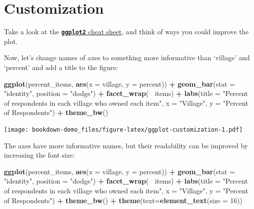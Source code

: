 \documentclass[]{book}
\newenvironment{Shaded}{\begin{snugshade}}{\end{snugshade}}
\newcommand{\KeywordTok}[1]{\textcolor[rgb]{0.13,0.29,0.53}{\textbf{#1}}}
\newcommand{\DataTypeTok}[1]{\textcolor[rgb]{0.13,0.29,0.53}{#1}}
\newcommand{\DecValTok}[1]{\textcolor[rgb]{0.00,0.00,0.81}{#1}}
\newcommand{\StringTok}[1]{\textcolor[rgb]{0.31,0.60,0.02}{#1}}
\newcommand{\OperatorTok}[1]{\textcolor[rgb]{0.81,0.36,0.00}{\textbf{#1}}}
\newcommand{\NormalTok}[1]{#1}
\begin{document}
\section{Customization}\label{customization}

Take a look at the
\href{https://www.rstudio.com/wp-content/uploads/2016/11/ggplot2-cheatsheet-2.1.pdf}{\textbf{\texttt{ggplot2}}
cheat sheet}, and think of ways you could improve the plot.

Now, let's change names of axes to something more informative than
`village' and `percent' and add a title to the figure:

\begin{Shaded}
\begin{Highlighting}[]
\KeywordTok{ggplot}\NormalTok{(percent_items, }\KeywordTok{aes}\NormalTok{(}\DataTypeTok{x =}\NormalTok{ village, }\DataTypeTok{y =}\NormalTok{ percent)) }\OperatorTok{+}
\StringTok{    }\KeywordTok{geom_bar}\NormalTok{(}\DataTypeTok{stat =} \StringTok{"identity"}\NormalTok{, }\DataTypeTok{position =} \StringTok{"dodge"}\NormalTok{) }\OperatorTok{+}
\StringTok{    }\KeywordTok{facet_wrap}\NormalTok{(}\OperatorTok{~}\StringTok{ }\NormalTok{items) }\OperatorTok{+}
\StringTok{    }\KeywordTok{labs}\NormalTok{(}\DataTypeTok{title =} \StringTok{"Percent of respondents in each village who owned each item"}\NormalTok{,}
         \DataTypeTok{x =} \StringTok{"Village"}\NormalTok{,}
         \DataTypeTok{y =} \StringTok{"Percent of Respondents"}\NormalTok{) }\OperatorTok{+}
\StringTok{    }\KeywordTok{theme_bw}\NormalTok{()}
\end{Highlighting}
\end{Shaded}

\texttt{[image: bookdown-demo\_files/figure-latex/ggplot-customization-1.pdf]}

The axes have more informative names, but their readability can be
improved by increasing the font size:

\begin{Shaded}
\begin{Highlighting}[]
\KeywordTok{ggplot}\NormalTok{(percent_items, }\KeywordTok{aes}\NormalTok{(}\DataTypeTok{x =}\NormalTok{ village, }\DataTypeTok{y =}\NormalTok{ percent)) }\OperatorTok{+}
\StringTok{    }\KeywordTok{geom_bar}\NormalTok{(}\DataTypeTok{stat =} \StringTok{"identity"}\NormalTok{, }\DataTypeTok{position =} \StringTok{"dodge"}\NormalTok{) }\OperatorTok{+}
\StringTok{    }\KeywordTok{facet_wrap}\NormalTok{(}\OperatorTok{~}\StringTok{ }\NormalTok{items) }\OperatorTok{+}
\StringTok{    }\KeywordTok{labs}\NormalTok{(}\DataTypeTok{title =} \StringTok{"Percent of respondents in each village who owned each item"}\NormalTok{,}
         \DataTypeTok{x =} \StringTok{"Village"}\NormalTok{,}
         \DataTypeTok{y =} \StringTok{"Percent of Respondents"}\NormalTok{) }\OperatorTok{+}
\StringTok{    }\KeywordTok{theme_bw}\NormalTok{() }\OperatorTok{+}
\StringTok{    }\KeywordTok{theme}\NormalTok{(}\DataTypeTok{text=}\KeywordTok{element_text}\NormalTok{(}\DataTypeTok{size =} \DecValTok{16}\NormalTok{))}
\end{Highlighting}
\end{Shaded}
\end{document}
